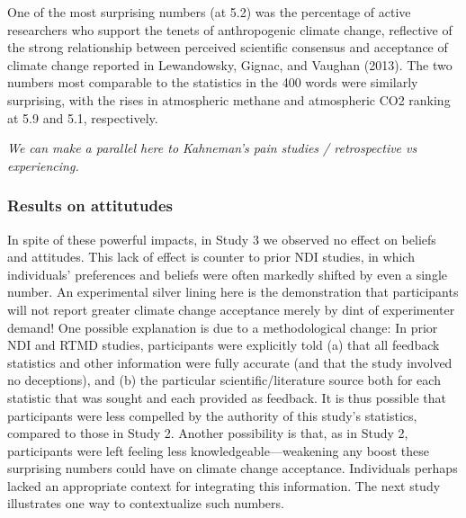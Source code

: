 One of the most surprising numbers (at 5.2) was the percentage of active
researchers who support the tenets of anthropogenic climate change, reflective
of the strong relationship between perceived scientific consensus and acceptance
of climate change reported in Lewandowsky, Gignac, and Vaughan (2013). The two
numbers most comparable to the statistics in the 400 words were similarly
surprising, with the rises in atmospheric methane and atmospheric CO2 ranking at
5.9 and 5.1, respectively.

\emph{We can make a parallel here to Kahneman's pain studies / retrospective vs
experiencing.}

\subsubsection{Results on attitutudes}

In spite of these powerful impacts, in Study 3 we observed no effect on beliefs
and attitudes. This lack of effect is counter to prior NDI studies, in which
individuals’ preferences and beliefs were often markedly shifted by even a
single number. An experimental silver lining here is the demonstration that
participants will not report greater climate change acceptance merely by dint of
experimenter demand! One possible explanation is due to a methodological change:
In prior NDI and RTMD studies, participants were explicitly told (a) that all
feedback statistics and other information were fully accurate (and that the
study involved no deceptions), and (b) the particular scientific/literature
source both for each statistic that was sought and each provided as feedback.
It is thus possible that participants were less compelled by the authority of
this study’s statistics, compared to those in Study 2.  Another possibility is
that, as in Study 2, participants were left feeling less knowledgeable—weakening
any boost these surprising numbers could have on climate change acceptance.
Individuals perhaps lacked an appropriate context for integrating this
information. The next study illustrates one way to contextualize such numbers.

